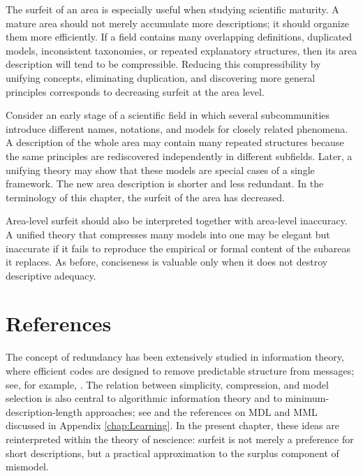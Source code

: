 The surfeit of an area is especially useful when studying scientific maturity. A mature area should not merely accumulate more descriptions; it should organize them more efficiently. If a field contains many overlapping definitions, duplicated models, inconsistent taxonomies, or repeated explanatory structures, then its area description will tend to be compressible. Reducing this compressibility by unifying concepts, eliminating duplication, and discovering more general principles corresponds to decreasing surfeit at the area level.

\begin{example}
Consider an early stage of a scientific field in which several subcommunities introduce different names, notations, and models for closely related phenomena. A description of the whole area may contain many repeated structures because the same principles are rediscovered independently in different subfields. Later, a unifying theory may show that these models are special cases of a single framework. The new area description is shorter and less redundant. In the terminology of this chapter, the surfeit of the area has decreased.
\end{example}

Area-level surfeit should also be interpreted together with area-level inaccuracy. A unified theory that compresses many models into one may be elegant but inaccurate if it fails to reproduce the empirical or formal content of the subareas it replaces. As before, conciseness is valuable only when it does not destroy descriptive adequacy.

%
%

\section*{References}

The concept of redundancy has been extensively studied in information theory, where efficient codes are designed to remove predictable structure from messages; see, for example, \cite{abramson1963information}. The relation between simplicity, compression, and model selection is also central to algorithmic information theory and to minimum-description-length approaches; see \cite{li2013introduction} and the references on MDL and MML discussed in Appendix \ref{chap:Learning}. In the present chapter, these ideas are reinterpreted within the theory of nescience: surfeit is not merely a preference for short descriptions, but a practical approximation to the surplus component of mismodel.

